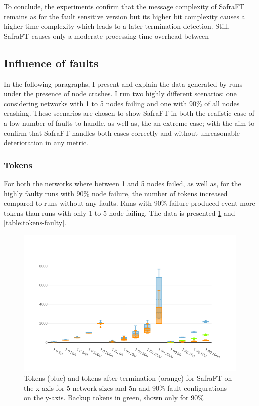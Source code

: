 To conclude, the experiments confirm that the message complexity of SafraFT remains as for the fault sensitive version but its higher bit complexity causes a higher time complexity which leads to a later termination detection. 
Still, SafraFT causes only a moderate processing time overhead between %


\subsection{Influence of faults}
In the following paragraphs, I present and explain the data generated by runs under the presence of node crashes.
I run two highly different scenarios: one considering networks with 1 to 5 nodes failing and one with 90\% of all nodes crashing.
These scenarios are chosen to show SafraFT in both the realistic case of a low number of faults to handle, as well as, the an extreme case; with the aim to confirm that SafraFT handles both cases correctly and without unreasonable deterioration in any metric.

\subsubsection{Tokens}
\label{ssec:tokens-faulty}
For both the networks where between 1 and 5 nodes failed, as well as, for the highly faulty runs with 90\% node failure, the number of tokens increased compared to runs without any faults.
Runs with 90\% failure produced event more tokens than runs with only 1 to 5 node failing.
The data is presented \cref{fig:tokens-and-tokens-after-faulty} and \cref{table:tokens-faulty}. %

\begin{figure}
	\includegraphics{figures/tokens-and-tokens-after-faulty.png}
	\caption{Tokens (blue) and tokens after termination (orange) for SafraFT on the x-axis for 5 network sizes and 5n and 90\% fault configurations on the y-axis.		Backup tokens in green, shown only for 90\%}
	\label{fig:tokens-and-tokens-after-faulty}
\end{figure}

